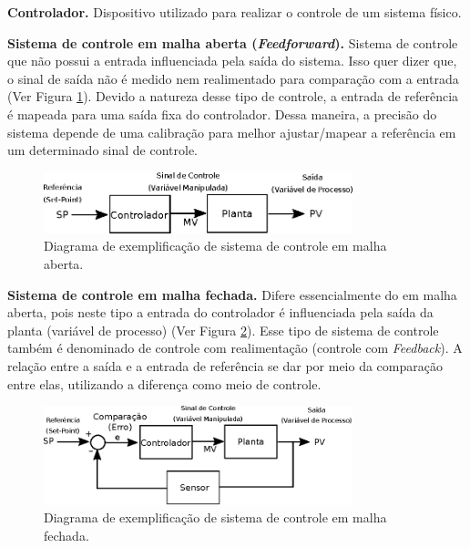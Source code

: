 \textbf{Controlador.} Dispositivo utilizado para realizar o controle de um sistema físico.



\textbf{Sistema de controle em malha aberta (\emph{Feedforward}).} Sistema de controle que não possui a entrada influenciada pela saída do sistema. Isso quer dizer que, o sinal de saída não é medido nem realimentado para comparação com a entrada (Ver Figura \ref{fig:ilustracao_sistema_malha_aberta}). Devido a natureza desse tipo de controle, a entrada de referência é mapeada para uma saída fixa do controlador. Dessa maneira, a precisão do sistema depende de uma calibração para melhor ajustar/mapear a referência em um determinado sinal de controle.

\begin{figure}[H]
    \centering
    \includegraphics[width=0.8\textwidth]{figuras/ilustracoes/diagrama_sistema_malha_aberta.eps}
    \caption{Diagrama de exemplificação de sistema de controle em malha aberta.}
    \label{fig:ilustracao_sistema_malha_aberta}
\end{figure}

\textbf{Sistema de controle em malha fechada.} Difere essencialmente do em malha aberta, pois neste tipo a entrada do controlador é influenciada pela saída da planta (variável de processo) (Ver Figura \ref{fig:ilustracao_sistema_malha_fechada}). Esse tipo de sistema de controle também é denominado de controle com realimentação (controle com \emph{Feedback}). A relação entre a saída e a entrada de referência se dar por meio da comparação entre elas, utilizando a diferença como meio de controle.

\begin{figure}[H]
    \centering
    \includegraphics[width=0.8\textwidth]{figuras/ilustracoes/diagrama_sistema_malha_fechada.eps}
    \caption{Diagrama de exemplificação de sistema de controle em malha fechada.}
    \label{fig:ilustracao_sistema_malha_fechada}
\end{figure}


